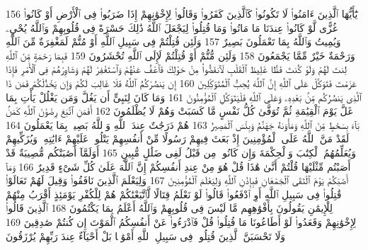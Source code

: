 {\tiny\colorbox{cl_aya}{156}} يَٰٓأَيُّهَا ٱلَّذِينَ ءَامَنُوا۟ لَا تَكُونُوا۟ كَٱلَّذِينَ كَفَرُوا۟ وَقَالُوا۟ لِإِخْوَٰنِهِمْ إِذَا ضَرَبُوا۟ فِى ٱلْأَرْضِ أَوْ كَانُوا۟ غُزًّى لَّوْ كَانُوا۟ عِندَنَا مَا مَاتُوا۟ وَمَا قُتِلُوا۟ لِيَجْعَلَ ٱللَّهُ ذَٰلِكَ حَسْرَةً فِى قُلُوبِهِمْ وَٱللَّهُ يُحْىِۦ وَيُمِيتُ وَٱللَّهُ بِمَا تَعْمَلُونَ بَصِيرٌ
{\tiny\colorbox{cl_aya}{157}} وَلَئِن قُتِلْتُمْ فِى سَبِيلِ ٱللَّهِ أَوْ مُتُّمْ لَمَغْفِرَةٌ مِّنَ ٱللَّهِ وَرَحْمَةٌ خَيْرٌ مِّمَّا يَجْمَعُونَ
{\tiny\colorbox{cl_aya}{158}} وَلَئِن مُّتُّمْ أَوْ قُتِلْتُمْ لَإِلَى ٱللَّهِ تُحْشَرُونَ
{\tiny\colorbox{cl_aya}{159}} فَبِمَا رَحْمَةٍ مِّنَ ٱللَّهِ لِنتَ لَهُمْ وَلَوْ كُنتَ فَظًّا غَلِيظَ ٱلْقَلْبِ لَٱنفَضُّوا۟ مِنْ حَوْلِكَ فَٱعْفُ عَنْهُمْ وَٱسْتَغْفِرْ لَهُمْ وَشَاوِرْهُمْ فِى ٱلْأَمْرِ فَإِذَا عَزَمْتَ فَتَوَكَّلْ عَلَى ٱللَّهِ إِنَّ ٱللَّهَ يُحِبُّ ٱلْمُتَوَكِّلِينَ
{\tiny\colorbox{cl_aya}{160}} إِن يَنصُرْكُمُ ٱللَّهُ فَلَا غَالِبَ لَكُمْ وَإِن يَخْذُلْكُمْ فَمَن ذَا ٱلَّذِى يَنصُرُكُم مِّنۢ بَعْدِهِۦ وَعَلَى ٱللَّهِ فَلْيَتَوَكَّلِ ٱلْمُؤْمِنُونَ
{\tiny\colorbox{cl_aya}{161}} وَمَا كَانَ لِنَبِىٍّ أَن يَغُلَّ وَمَن يَغْلُلْ يَأْتِ بِمَا غَلَّ يَوْمَ ٱلْقِيَٰمَةِ ثُمَّ تُوَفَّىٰ كُلُّ نَفْسٍ مَّا كَسَبَتْ وَهُمْ لَا يُظْلَمُونَ
{\tiny\colorbox{cl_aya}{162}} أَفَمَنِ ٱتَّبَعَ رِضْوَٰنَ ٱللَّهِ كَمَنۢ بَآءَ بِسَخَطٍ مِّنَ ٱللَّهِ وَمَأْوَىٰهُ جَهَنَّمُ وَبِئْسَ ٱلْمَصِيرُ
{\tiny\colorbox{cl_aya}{163}} هُمْ دَرَجَٰتٌ عِندَ ٱللَّهِ وَٱللَّهُ بَصِيرٌۢ بِمَا يَعْمَلُونَ
{\tiny\colorbox{cl_aya}{164}} لَقَدْ مَنَّ ٱللَّهُ عَلَى ٱلْمُؤْمِنِينَ إِذْ بَعَثَ فِيهِمْ رَسُولًا مِّنْ أَنفُسِهِمْ يَتْلُوا۟ عَلَيْهِمْ ءَايَٰتِهِۦ وَيُزَكِّيهِمْ وَيُعَلِّمُهُمُ ٱلْكِتَٰبَ وَٱلْحِكْمَةَ وَإِن كَانُوا۟ مِن قَبْلُ لَفِى ضَلَٰلٍ مُّبِينٍ
{\tiny\colorbox{cl_aya}{165}} أَوَلَمَّآ أَصَٰبَتْكُم مُّصِيبَةٌ قَدْ أَصَبْتُم مِّثْلَيْهَا قُلْتُمْ أَنَّىٰ هَٰذَا قُلْ هُوَ مِنْ عِندِ أَنفُسِكُمْ إِنَّ ٱللَّهَ عَلَىٰ كُلِّ شَىْءٍ قَدِيرٌ
{\tiny\colorbox{cl_aya}{166}} وَمَآ أَصَٰبَكُمْ يَوْمَ ٱلْتَقَى ٱلْجَمْعَانِ فَبِإِذْنِ ٱللَّهِ وَلِيَعْلَمَ ٱلْمُؤْمِنِينَ
{\tiny\colorbox{cl_aya}{167}} وَلِيَعْلَمَ ٱلَّذِينَ نَافَقُوا۟ وَقِيلَ لَهُمْ تَعَالَوْا۟ قَٰتِلُوا۟ فِى سَبِيلِ ٱللَّهِ أَوِ ٱدْفَعُوا۟ قَالُوا۟ لَوْ نَعْلَمُ قِتَالًا لَّٱتَّبَعْنَٰكُمْ هُمْ لِلْكُفْرِ يَوْمَئِذٍ أَقْرَبُ مِنْهُمْ لِلْإِيمَٰنِ يَقُولُونَ بِأَفْوَٰهِهِم مَّا لَيْسَ فِى قُلُوبِهِمْ وَٱللَّهُ أَعْلَمُ بِمَا يَكْتُمُونَ
{\tiny\colorbox{cl_aya}{168}} ٱلَّذِينَ قَالُوا۟ لِإِخْوَٰنِهِمْ وَقَعَدُوا۟ لَوْ أَطَاعُونَا مَا قُتِلُوا۟ قُلْ فَٱدْرَءُوا۟ عَنْ أَنفُسِكُمُ ٱلْمَوْتَ إِن كُنتُمْ صَٰدِقِينَ
{\tiny\colorbox{cl_aya}{169}} وَلَا تَحْسَبَنَّ ٱلَّذِينَ قُتِلُوا۟ فِى سَبِيلِ ٱللَّهِ أَمْوَٰتًۢا بَلْ أَحْيَآءٌ عِندَ رَبِّهِمْ يُرْزَقُونَ

